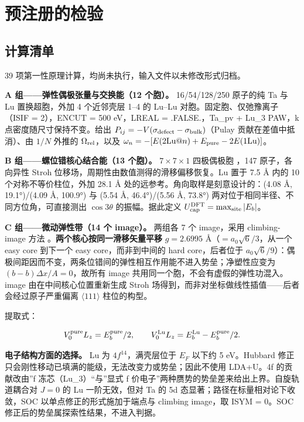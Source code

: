 \hypertarget{ux9884ux6ce8ux518cux7684ux68c0ux9a8c}{%
\section{预注册的检验}\label{sec:ux9884ux6ce8ux518cux7684ux68c0ux9a8c}}

\hypertarget{ux8ba1ux7b97ux6e05ux5355}{%
\subsection{计算清单}\label{sec:ux8ba1ux7b97ux6e05ux5355}}

39 项第一性原理计算，均尚未执行，输入文件以未修改形式归档。

\textbf{A 组------弹性偶极张量与交换能（12 个胞）。} 16/54/128/250 原子的纯 Ta 与 Lu 置换超胞，外加 4 个近邻壳层 1--4 的 Lu--Lu 对胞。固定胞、仅弛豫离子（ISIF = 2），ENCUT = 500 eV，LREAL = .FALSE.，Ta\_pv + Lu\_3 PAW，k 点密度随尺寸保持不变。给出 \(P_{ij} = -V(\sigma_{\rm defect} - \sigma_{\rm bulk})\)（Pulay 贡献在差值中抵消）、由 \(1/N\) 外推的 \(\Omega_{\rm rel}\)，以及 \(\omega_n = -[E(2\mathrm{Lu}@n) + E_{\rm pure} - 2E(1\mathrm{Lu})]\)。

\textbf{B 组------螺位错核心结合能（13 个胞）。} \(7\times7\times1\) 四极偶极胞 \cite{ventelon2007}，147 原子，各向异性 Stroh 位移场，周期性由数值测得的滑移偏移恢复。Lu 置于 7.5 Å 内的 10 个对称不等价柱位，外加 28.1 Å 处的远参考。角向取样是刻意设计的：(4.08 Å, 19.1°)/(4.09 Å, 100.9°) 与 (5.54 Å, 46.4°)/(5.56 Å, 73.8°) 两对位于相同半径、不同方位角，可直接测出 \(\cos3\theta\) 的振幅。据此定义 \(U_{\rm cap}^{\rm DFT} = \max_{\rm site}|E_b|\)。

\textbf{C 组------微动弹性带（14 个 image）。} 两组各 7 个 image，采用 climbing-image 方法 \cite{henkelman2000}。\textbf{两个核心按同一滑移矢量平移} \(g = 2.6995\) Å（\(= a_0\sqrt{6}/3\)，从一个 easy core 到下一个 easy core，而非到中间的 hard core，后者位于 \(a_0\sqrt{6}/9\)）：偶极间距因而不变，两条位错间的弹性相互作用能不进入势垒；净塑性应变为 \((b-b)\Delta x/A = 0\)，故所有 image 共用同一个胞，不会有虚假的弹性功混入。image 由在中间核心位置重新生成 Stroh 场得到，而非对坐标做线性插值------后者会经过原子严重偏离 \(\langle111\rangle\) 柱位的构型。

提取式：

\[V_0^{\rm pure}L_z = E_b^{\rm pure}/2,\qquad V_0^{\rm Lu}L_z = E_b^{\rm Lu} - E_b^{\rm pure}/2.\]

\textbf{电子结构方面的选择。} Lu 为 \(4f^{14}\)，满壳层位于 \(E_F\) 以下约 5 eV。Hubbard 修正只会刚性移动已填满的能级，无法改变力或势垒；因此不使用 LDA+U。4f 的贡献改由''f 冻芯（Lu\_3）``与''显式 f 价电子''两种赝势的势垒差来给出上界。自旋轨道耦合对 \(J = 0\) 的 Lu 一阶无效，但对 Ta 的 5d 态显著；路径在标量相对论下收敛，SOC 以单点修正的形式施加于端点与 climbing image，取 ISYM = 0。SOC 修正后的势垒属探索性结果，不进入判据。

